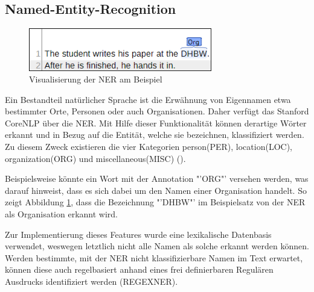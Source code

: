 \subsection{Named-Entity-Recognition}
\label{subsec:ner}
\begin{figure}
\includegraphics[width=8cm]{pictures/NER.png}
\caption{Visualisierung der NER am Beispiel}
\label{fig:NER}
\end{figure}
Ein Bestandteil natürlicher Sprache ist die Erwähnung von Eigennamen etwa bestimmter Orte, Personen oder auch Organisationen. Daher verfügt das Stanford CoreNLP über die \ac{NER}. Mit Hilfe dieser Funktionalität können derartige Wörter erkannt und in Bezug auf die Entität, welche sie bezeichnen,  klassifiziert werden. Zu diesem Zweck existieren die vier Kategorien person(PER), location(LOC), organization(ORG) und miscellaneous(MISC) (\cite[vgl.][4]{STANFORDNER}).\par
Beispielsweise könnte ein Wort mit der Annotation "'ORG"' versehen werden, was darauf hinweist, dass es sich dabei um den Namen einer Organisation handelt. So zeigt Abbildung \ref{fig:NER}, dass die Bezeichnung "'DHBW"' im Beispielsatz von der \ac{NER} als Organisation erkannt wird.\par
Zur Implementierung dieses Features wurde eine lexikalische Datenbasis verwendet, weswegen letztlich nicht alle Namen als solche erkannt werden können. Werden bestimmte, mit der \ac{NER} nicht klassifizierbare Namen im Text erwartet, können diese auch regelbasiert anhand eines frei definierbaren Regulären Ausdrucks identifiziert werden (REGEXNER).


